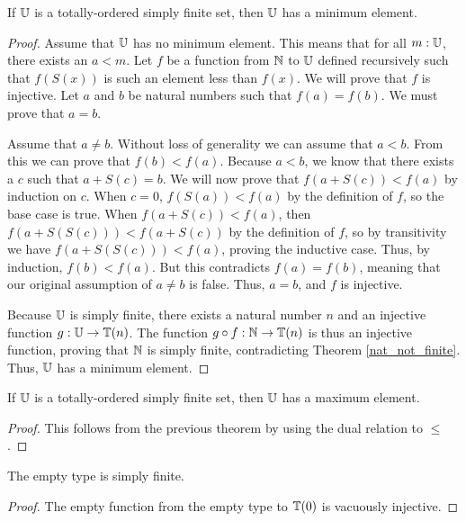 \documentclass[../../math.tex]{subfiles}
\begin{document}
\begin{theorem} \label{simple_finite_min}
    If $\mathbb{U}$ is a totally-ordered simply finite set, then $\mathbb{U}$ has a minimum
    element.
\end{theorem}
\begin{proof}
    Assume that $\mathbb{U}$ has no minimum element.  This means that for all $m : \mathbb{U}$,
    there exists an $a < m$.  Let $f$ be a function from $\mathbb{N}$ to $\mathbb{U}$ defined
    recursively such that $f(S(x))$ is such an element less than $f(x)$.  We
    will prove that $f$ is injective.  Let $a$ and $b$ be natural numbers such
    that $f(a) = f(b)$.  We must prove that $a = b$.

    Assume that $a \neq b$.  Without loss of generality we can assume that $a <
    b$.  From this we can prove that $f(b) < f(a)$.  Because $a < b$, we know
    that there exists a $c$ such that $a + S(c) = b$.  We will now prove that
    $f(a + S(c)) < f(a)$ by induction on $c$.  When $c = 0$, $f(S(a)) < f(a)$ by
    the definition of $f$, so the base case is true.  When $f(a + S(c)) < f(a)$,
    then $f(a + S(S(c))) < f(a + S(c))$ by the definition of $f$, so by
    transitivity we have $f(a + S(S(c))) < f(a)$, proving the inductive case.
    Thus, by induction, $f(b) < f(a)$.  But this contradicts $f(a) = f(b)$,
    meaning that our original assumption of $a \neq b$ is false.  Thus, $a = b$,
    and $f$ is injective.

    Because $\mathbb{U}$ is simply finite, there exists a natural number $n$ and an
    injective function $g : \mathbb{U} \to \mathbb{T}(n)$.  The function $g \circ f : \mathbb{N} \to
    \mathbb{T}(n)$ is thus an injective function, proving that $\mathbb{N}$ is simply finite,
    contradicting Theorem \ref{nat_not_finite}.  Thus, $\mathbb{U}$ has a minimum
    element.
\end{proof}

\begin{theorem} \label{simple_finite_max}
    If $\mathbb{U}$ is a totally-ordered simply finite set, then $\mathbb{U}$ has a maximum
    element.
\end{theorem}
\begin{proof}
    This follows from the previous theorem by using the dual relation to $\leq$.
\end{proof}

\begin{theorem} \label{empty_simple_finite}
    The empty type is simply finite.
\end{theorem}
\begin{proof}
    The empty function from the empty type to $\mathbb{T}(0)$ is vacuously injective.
\end{proof}
\end{document}
